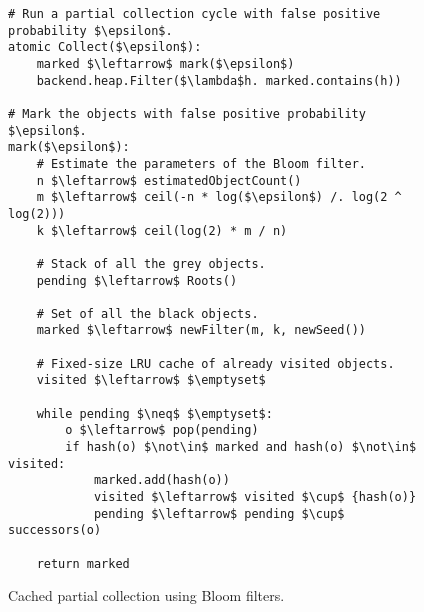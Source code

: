 \begin{figure}[!ht]
  \caption{Cached partial collection using Bloom filters.}
  \label{alg:partial-bloom}

  \centering
  \begin{lstlisting}
# Run a partial collection cycle with false positive probability $\epsilon$.
atomic Collect($\epsilon$):
    marked $\leftarrow$ mark($\epsilon$)
    backend.heap.Filter($\lambda$h. marked.contains(h))

# Mark the objects with false positive probability $\epsilon$.
mark($\epsilon$):
    # Estimate the parameters of the Bloom filter.
    n $\leftarrow$ estimatedObjectCount()
    m $\leftarrow$ ceil(-n * log($\epsilon$) /. log(2 ^ log(2)))
    k $\leftarrow$ ceil(log(2) * m / n)

    # Stack of all the grey objects.
    pending $\leftarrow$ Roots()

    # Set of all the black objects.
    marked $\leftarrow$ newFilter(m, k, newSeed())

    # Fixed-size LRU cache of already visited objects.
    visited $\leftarrow$ $\emptyset$

    while pending $\neq$ $\emptyset$:
        o $\leftarrow$ pop(pending)
        if hash(o) $\not\in$ marked and hash(o) $\not\in$ visited:
            marked.add(hash(o))
            visited $\leftarrow$ visited $\cup$ {hash(o)}
            pending $\leftarrow$ pending $\cup$ successors(o)

    return marked
\end{lstlisting}
\end{figure}
